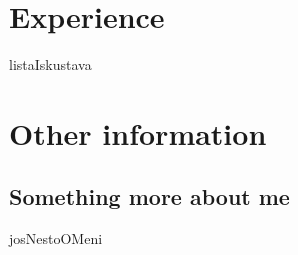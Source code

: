 \documentclass[letterpaper]{twentysecondcv} %
\begin{document}


\section{Experience}

\begin{twenty} %
listaIskustava
	
\end{twenty}


\section{Other information}

\subsection{Something more about me}

josNestoOMeni
\end{document}
